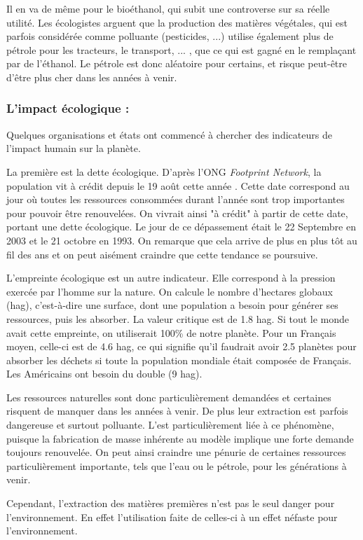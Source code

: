 Il en va de même pour le bioéthanol, qui subit une controverse sur sa réelle utilité. Les écologistes arguent que la production des matières végétales, qui est parfois considérée comme polluante (pesticides, ...) utilise également plus de pétrole pour les tracteurs, le transport, ... , que ce qui est gagné en le remplaçant par de l’éthanol. Le pétrole est donc aléatoire pour certains, et risque peut-être d'être plus cher dans les années à venir.


\subsubsection{L'impact écologique : } 

Quelques organisations et états ont commencé à chercher des indicateurs de l'impact humain sur la planète.

La première est la dette écologique. D'après l'ONG \textit{Footprint Network}, la population vit à crédit depuis le 19 août cette année \cite{DateACredit}. Cette date correspond au jour où toutes les ressources consommées durant l'année sont trop importantes pour pouvoir être renouvelées. On vivrait ainsi "à crédit" à partir de cette date, portant une dette écologique. Le jour de ce dépassement était le 22 Septembre en 2003 et le 21 octobre en 1993. On remarque que cela arrive de plus en plus tôt au fil des ans et on peut aisément craindre que cette tendance se poursuive.

L'empreinte écologique est un autre indicateur. Elle correspond à la pression exercée par l'homme sur la nature. On calcule le nombre d'hectares globaux (hag), c'est-à-dire une surface, dont une population a besoin pour générer ses ressources, puis les absorber. La valeur critique est de 1.8 hag. Si tout le monde avait cette empreinte, on utiliserait 100\% de notre planète. Pour un Français moyen, celle-ci est de 4.6 hag, ce qui signifie qu'il faudrait avoir 2.5 planètes pour absorber les déchets si toute la population mondiale était composée de Français. Les Américains ont besoin du double (9 hag).

\bigbreak
Les ressources naturelles sont donc particulièrement demandées et certaines risquent de manquer dans les années à venir. De plus leur extraction est parfois dangereuse et surtout polluante. L'\op est particulièrement liée à ce phénomène, puisque la fabrication de masse inhérente au modèle implique une forte demande toujours renouvelée. On peut ainsi craindre une pénurie de certaines ressources particulièrement importante, tels que l'eau ou le pétrole, pour les générations à venir.

\medbreak
Cependant, l'extraction des matières premières n'est pas le seul danger pour l'environnement. En effet l'utilisation faite de celles-ci à un effet néfaste pour l'environnement.






